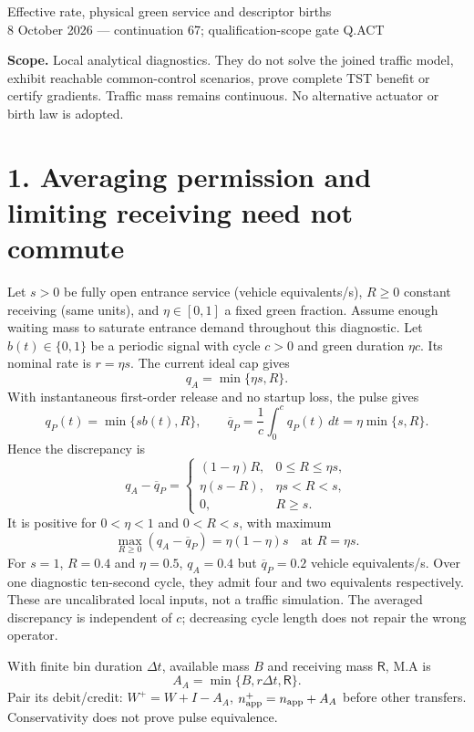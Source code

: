 \documentclass[11pt,a4paper]{article}
\begin{document}
{\Large Effective rate, physical green service and descriptor births}\\[4pt]
8 October 2026 --- continuation 67; qualification-scope gate Q.ACT

\textbf{Scope.} Local analytical diagnostics. They do not solve the joined
traffic model, exhibit reachable common-control scenarios, prove complete TST
benefit or certify gradients. Traffic mass remains continuous. No alternative
actuator or birth law is adopted.

\section*{1. Averaging permission and limiting receiving need not commute}
Let $s>0$ be fully open entrance service (vehicle equivalents/s), $R\ge0$
constant receiving (same units), and $\eta\in[0,1]$ a fixed green fraction.
Assume enough waiting mass to saturate entrance demand throughout this diagnostic.
Let $b(t)\in\{0,1\}$ be a periodic signal with cycle $c>0$ and green duration
$\eta c$. Its nominal rate is $r=\eta s$. The current ideal cap gives
\begin{equation}
q_A=\min\{\eta s,R\}.
\end{equation}
With instantaneous first-order release and no startup loss, the pulse gives
\begin{equation}
q_P(t)=\min\{s b(t),R\},\qquad
\overline q_P=\frac1c\int_0^c q_P(t)\,dt=\eta\min\{s,R\}.
\end{equation}
Hence the discrepancy is
\begin{equation}
q_A-\overline q_P=
\begin{cases}
(1-\eta)R,&0\le R\le\eta s,\\
\eta(s-R),&\eta s<R<s,\\
0,&R\ge s.
\end{cases}
\end{equation}
It is positive for $0<\eta<1$ and $0<R<s$, with maximum
\begin{equation}
\max_{R\ge0}(q_A-\overline q_P)=\eta(1-\eta)s
\quad\text{at }R=\eta s.
\end{equation}
For $s=1$, $R=0.4$ and $\eta=0.5$, $q_A=0.4$ but
$\overline q_P=0.2$ vehicle equivalents/s. Over one diagnostic ten-second
cycle, they admit four and two equivalents respectively. These are uncalibrated
local inputs, not a traffic simulation. The averaged discrepancy is independent
of $c$; decreasing cycle length does not repair the wrong operator.

With finite bin duration $\Delta t$, available mass $B$ and receiving mass
$\mathsf R$, M.A is
\begin{equation}
A_A=\min\{B,r\Delta t,\mathsf R\}.
\end{equation}
Pair its debit/credit: $W^+=W+I-A_A$, $n_{\rm app}^+=n_{\rm app}+A_A$
before other transfers. Conservativity does not prove pulse equivalence.
\end{document}
